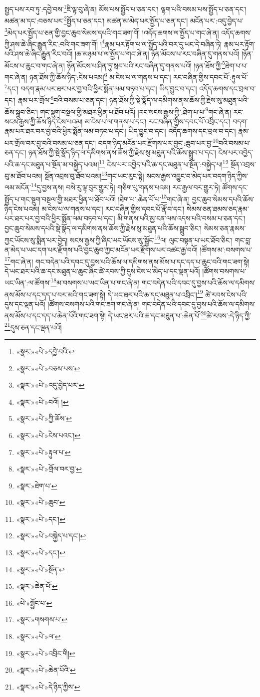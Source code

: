 སྤྱད་པས་རབ་ཏུ་:དབྱེ་བས་\footnote{«སྣར་»«པེ་»དབྱེ་བའི་}ཇི་ལྟ་བུ་ཞེ་ན། མོས་པས་སྤྱོད་པ་ཅན་དང་། ལྷག་པའི་བསམ་པས་སྤྱོད་པ་ཅན་དང་། མཚན་མ་དང་:བཅས་པར་\footnote{«སྣར་»«པེ་»བཅས་པས་}སྤྱོད་པ་ཅན་དང་། མཚན་མ་མེད་པར་སྤྱོད་པ་ཅན་དང་། མངོན་པར་:འདུ་བྱེད་པ་\footnote{«སྣར་»«པེ་»འདུ་བྱེད་པར་}མེད་པར་སྤྱོད་པ་ཅན་གྱི་བྱང་ཆུབ་སེམས་དཔའི་གང་ཟག་གོ། །འདོད་ཆགས་ལ་སྤྱོད་པ་གང་ཞེ་ན། འདོད་ཆགས་ཀྱི་ཤས་ཆེ་ཞིང་རྒྱུན་རིང་:བའི་གང་ཟག་གོ། །\footnote{«སྣར་»«པེ་»བའོ། །}རྣམ་པར་རྟོག་པ་ལ་སྤྱོད་པའི་བར་དུ་ཡང་དེ་བཞིན་ཏེ། རྣམ་པར་རྟོག་པའི་ཤས་ཆེ་ཞིང་རྒྱུན་རིང་བའོ། །ཆ་མཉམ་པ་ལ་སྤྱོད་པ་གང་ཞེ་ན། ཉོན་མོངས་པ་རང་བཞིན་དུ་གནས་པའོ། །ཉོན་མོངས་པ་ཆུང་བ་གང་ཞེ་ན། ཉོན་མོངས་པ་ཤིན་ཏུ་སྲབ་པའི་རང་བཞིན་དུ་གནས་པའོ། །ཉན་ཐོས་ཀྱི་\footnote{«སྣར་»«པེ་»ཀྱི་ཆོས་}ཐེག་པ་པ་གང་ཞེ་ན། ཉན་ཐོས་ཀྱི་ཆོས་ཉིད་:ངེས་པའམ།\footnote{«སྣར་»«པེ་»ངེས་པའང་།} མ་ངེས་པ་ལ་གནས་པ་དང་། རང་བཞིན་གྱིས་དབང་པོ་:རྟུལ་པོ་\footnote{«སྣར་»«པེ་»རྟུལ་པ་}དང་། བདག་རྣམ་པར་ཐར་པར་བྱ་བའི་ཕྱིར་སྨོན་ལམ་བཏབ་པ་དང་། ཡིད་བྱུང་བ་དང་། འདོད་ཆགས་དང་བྲལ་བ་དང་། རྣམ་པར་གྲོལ་\footnote{«སྣར་»«པེ་»གྲོལ་བར་བྱ་}བའི་བསམ་པ་ཅན་དང་། ཉན་ཐོས་ཀྱི་སྡེ་སྣོད་ལ་དམིགས་ནས་ཆོས་ཀྱི་རྗེས་སུ་མཐུན་པའི་ཆོས་སྒྲུབ་ཅིང་། གང་སྡུག་བསྔལ་གྱི་མཐར་ཕྱིན་པ་ཐོབ་པའོ། །རང་སངས་རྒྱས་ཀྱི་:ཐེག་པ་པ་\footnote{«སྣར་»ཐེག་པ་}གང་ཞེ་ན། རང་སངས་རྒྱས་ཀྱི་ཆོས་ཉིད་ངེས་པའམ། མ་ངེས་པ་ལ་གནས་པ་དང་། རང་བཞིན་གྱིས་དབང་པོ་འབྲིང་དང་། བདག་རྣམ་པར་ཐར་བར་བྱ་བའི་ཕྱིར་སྨོན་ལམ་བཏབ་པ་དང་། ཡིད་བྱུང་བ་དང་། འདོད་ཆགས་དང་བྲལ་བ་དང་། རྣམ་པར་གྲོལ་བར་བྱ་བའི་བསམ་པ་ཅན་དང་། བདག་ཉིད་མངོན་པར་རྫོགས་པར་བྱང་:ཆུབ་པར་བྱ་\footnote{«སྣར་»«པེ་»ཆུབ་}བའི་བསམ་པ་ཅན་དང་། ཉན་ཐོས་ཀྱི་སྡེ་སྣོད་ཉིད་ལ་དམིགས་ནས་ཆོས་ཀྱི་རྗེས་སུ་མཐུན་པའི་ཆོས་སྒྲུབ་པ་དང་། ངེས་པར་འབྱེད་པའི་ཆ་དང་མཐུན་པ་སྔོན་མ་བསྐྱེད་པའམ།\footnote{«སྣར་»«པེ་»དང་།} ངེས་པར་འབྱེད་པའི་ཆ་དང་མཐུན་པ་སྔོན་:བསྐྱེད་པ།\footnote{«སྣར་»«པེ་»བསྐྱེད་པ་དང་།} སྔོན་འབྲས་བུ་མ་ཐོབ་པའམ། སྔོན་འབྲས་བུ་ཐོབ་པའམ།\footnote{«སྣར་»«པེ་»དང་།}གང་ཡང་རུང་སྟེ། སངས་རྒྱས་འབྱུང་བ་མེད་པར་བདག་ཉིད་ཀྱིས་ལམ་མངོན་\footnote{«སྣར་»«པེ་»སྔོན་}དུ་བྱས་ནས། བསེ་རུ་ལྟ་བུར་གྱུར་ཏེ། གཅིག་པུ་གནས་པའམ། རང་རྒྱལ་བར་གྱུར་ཏེ། ཚོགས་དང་སྤྱོད་པ་གང་སྡུག་བསྔལ་གྱི་མཐར་ཕྱིན་པ་ཐོབ་པའོ། །ཐེག་པ་:ཆེན་པོ་པ་\footnote{«སྣར་»ཆེན་པོ་}གང་ཞེ་ན། བྱང་ཆུབ་སེམས་དཔའི་ཆོས་ཉིད་ངེས་པའམ། མ་ངེས་པ་ལ་གནས་པ་དང་། རང་བཞིན་གྱིས་དབང་པོ་རྣོ་བ་དང་། སེམས་ཅན་ཐམས་ཅད་རྣམ་པར་ཐར་པར་བྱ་བའི་ཕྱིར་སྨོན་ལམ་བཏབ་པ་དང་། མི་གནས་པའི་མྱ་ངན་ལས་འདས་པའི་བསམ་པ་ཅན་དང་། བྱང་ཆུབ་སེམས་དཔའི་སྡེ་སྣོད་ལ་དམིགས་ནས་ཆོས་ཀྱི་རྗེས་སུ་མཐུན་པའི་ཆོས་སྒྲུབ་ཅིང་། སེམས་ཅན་རྣམས་ཀྱང་ཡོངས་སུ་སྨིན་པར་བྱེད། སངས་རྒྱས་ཀྱི་ཞིང་ཡང་ཡོངས་སུ་སྦྱོང་\footnote{«པེ་»སྦྱོང་པ་}ལ། ལུང་བསྟན་པ་ཡང་ཐོབ་ཅིང་། གང་བླ་ན་མེད་པ་ཡང་དག་པར་རྫོགས་པའི་བྱང་ཆུབ་ཀྱང་མངོན་པར་རྫོགས་པར་འཚང་རྒྱ་བའོ། །ཚོགས་མ་:བསགས་པ་\footnote{«སྣར་»གསགས་པ་}གང་ཞེ་ན། གང་བདེན་པའི་དབང་དུ་བྱས་པའི་ཆོས་ལ་དམིགས་ནས་མོས་པ་དང་དད་པ་ཆུང་བའི་གང་ཟག་སྟེ། དེ་ཡང་ཐར་པའི་ཆ་དང་མཐུན་པ་ཆུང་ཞིང་ཚེ་རབས་ཀྱི་དུས་ངེས་པ་མེད་པ་དང་ལྡན་པའོ། །ཚོགས་བསགས་པ་ཡང་ཡིན་:ལ་ཚོགས་\footnote{«སྣར་»«པེ་»ལ་}མ་བསགས་པ་ཡང་ཡིན་པ་གང་ཞེ་ན། གང་བདེན་པའི་དབང་དུ་བྱས་པའི་ཆོས་ལ་དམིགས་ནས་མོས་པ་དང་དད་པ་བར་མའི་གང་ཟག་སྟེ། དེ་ཡང་ཐར་པའི་ཆ་དང་མཐུན་པ་འབྲིང་།\footnote{«སྣར་»«པེ་»འབྲིང་གི།} ཚེ་རབས་ངེས་པའི་དུས་དང་ལྡན་པའོ། །ཚོགས་བསགས་པའི་གང་ཟག་གང་ཞེ་ན། གང་བདེན་པའི་དབང་དུ་བྱས་པའི་ཆོས་ལ་དམིགས་ནས་མོས་པ་དང་དད་པ་ཆེན་པོའི་གང་ཟག་སྟེ། དེ་ཡང་ཐར་པའི་ཆ་དང་མཐུན་པ་:ཆེན་པོ་\footnote{«སྣར་»«པེ་»ཆེན་པོའི་}ཚེ་རབས་:དེ་ཉིད་ཀྱི་\footnote{«སྣར་»«པེ་»དེ་ཉིད་ཀྱིས་}དུས་ཅན་དང་ལྡན་པའོ། 